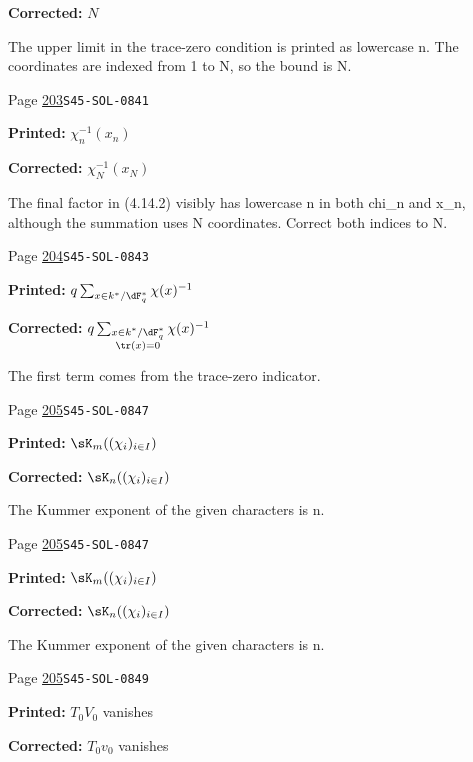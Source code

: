 \begin{description}
\par\noindent\textbf{Corrected:} \(N\)
\par\noindent The upper limit in the trace-zero condition is printed as lowercase n. The coordinates are indexed from 1 to N, so the bound is N.
\smallskip
\item[\hypertarget{apparatus:EN-0140}{140}] Page \hyperlink{printpage:en:203}{203}\quad\texttt{S45-SOL-0841}
\par\noindent\textbf{Printed:} \(\chi_n^{-1}(x_n)\)
\par\noindent\textbf{Corrected:} \(\chi_N^{-1}(x_N)\)
\par\noindent The final factor in (4.14.2) visibly has lowercase n in both chi\_n and x\_n, although the summation uses N coordinates. Correct both indices to N.
\smallskip
\item[\hypertarget{apparatus:EN-0141}{141}] Page \hyperlink{printpage:en:204}{204}\quad\texttt{S45-SOL-0843}
\par\noindent\textbf{Printed:} \(q\sum_{x\in k^\ast/\dF_q^\ast} \chi(x)^{-1}\)
\par\noindent\textbf{Corrected:} \(q\sum_{\substack{x\in k^\ast/\dF_q^\ast\\\tr(x)=0}} \chi(x)^{-1}\)
\par\noindent The first term comes from the trace-zero indicator.
\smallskip
\item[\hypertarget{apparatus:EN-0142}{142}] Page \hyperlink{printpage:en:205}{205}\quad\texttt{S45-SOL-0847}
\par\noindent\textbf{Printed:} \(\sK_m((\chi_i)_{i\in I})\)
\par\noindent\textbf{Corrected:} \(\sK_n((\chi_i)_{i\in I})\)
\par\noindent The Kummer exponent of the given characters is n.
\smallskip
\item[\hypertarget{apparatus:EN-0143}{143}] Page \hyperlink{printpage:en:205}{205}\quad\texttt{S45-SOL-0847}
\par\noindent\textbf{Printed:} \(\sK_m((\chi_i)_{i\in I})\)
\par\noindent\textbf{Corrected:} \(\sK_n((\chi_i)_{i\in I})\)
\par\noindent The Kummer exponent of the given characters is n.
\smallskip
\item[\hypertarget{apparatus:EN-0144}{144}] Page \hyperlink{printpage:en:205}{205}\quad\texttt{S45-SOL-0849}
\par\noindent\textbf{Printed:} $T_0 V_0$ vanishes
\par\noindent\textbf{Corrected:} $T_0 v_0$ vanishes

\end{description}
